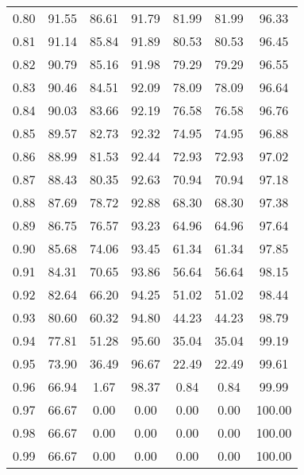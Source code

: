 \begin{tabular}{|c|c|c|c|c|c|c|}
      0.80 &     91.55 &     86.61 &      91.79 &   81.99 &      81.99 &         96.33 \\
      0.81 &     91.14 &     85.84 &      91.89 &   80.53 &      80.53 &         96.45 \\
      0.82 &     90.79 &     85.16 &      91.98 &   79.29 &      79.29 &         96.55 \\
      0.83 &     90.46 &     84.51 &      92.09 &   78.09 &      78.09 &         96.64 \\
      0.84 &     90.03 &     83.66 &      92.19 &   76.58 &      76.58 &         96.76 \\
      0.85 &     89.57 &     82.73 &      92.32 &   74.95 &      74.95 &         96.88 \\
      0.86 &     88.99 &     81.53 &      92.44 &   72.93 &      72.93 &         97.02 \\
      0.87 &     88.43 &     80.35 &      92.63 &   70.94 &      70.94 &         97.18 \\
      0.88 &     87.69 &     78.72 &      92.88 &   68.30 &      68.30 &         97.38 \\
      0.89 &     86.75 &     76.57 &      93.23 &   64.96 &      64.96 &         97.64 \\
      0.90 &     85.68 &     74.06 &      93.45 &   61.34 &      61.34 &         97.85 \\
      0.91 &     84.31 &     70.65 &      93.86 &   56.64 &      56.64 &         98.15 \\
      0.92 &     82.64 &     66.20 &      94.25 &   51.02 &      51.02 &         98.44 \\
      0.93 &     80.60 &     60.32 &      94.80 &   44.23 &      44.23 &         98.79 \\
      0.94 &     77.81 &     51.28 &      95.60 &   35.04 &      35.04 &         99.19 \\
      0.95 &     73.90 &     36.49 &      96.67 &   22.49 &      22.49 &         99.61 \\
      0.96 &     66.94 &      1.67 &      98.37 &    0.84 &       0.84 &         99.99 \\
      0.97 &     66.67 &      0.00 &       0.00 &    0.00 &       0.00 &        100.00 \\
      0.98 &     66.67 &      0.00 &       0.00 &    0.00 &       0.00 &        100.00 \\
      0.99 &     66.67 &      0.00 &       0.00 &    0.00 &       0.00 &        100.00 \\
\bottomrule
\end{tabular}
